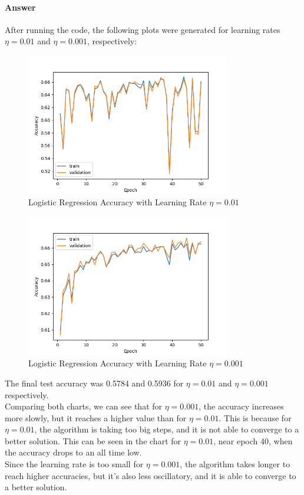 \documentclass{article}
\begin{document}
\paragraph{Answer} After running the code, the following plots were generated for learning rates $\eta = 0.01$ and $\eta = 0.001$, respectively:
\begin{figure}[H]
    \centering
    \includegraphics[width=0.8\textwidth]{"plots/1_1_b_001.png"}
    \caption{Logistic Regression Accuracy with Learning Rate $\eta = 0.01$}
    \label{1.1.b 0.01 Plot}
\end{figure}

\begin{figure}[H]
    \centering
    \includegraphics[width=0.8\textwidth]{"plots/1_1_b_0001.png"}
    \caption{Logistic Regression Accuracy with Learning Rate $\eta= 0.001$}
    \label{1.1.b 0.0001 Plot}
\end{figure}

The final test accuracy was 0.5784 and 0.5936 for $\eta = 0.01$ and $\eta = 0.001$ respectively.\\
Comparing both charts, we can see that for $\eta = 0.001$, the accuracy increases more slowly, but it reaches a higher value than for $\eta = 0.01$. 
This is because for $\eta = 0.01$, the algorithm is taking too big steps, and it is not able to converge to a better solution. This can be 
seen in the chart for $\eta = 0.01$, near epoch 40, when the accuracy drops to an all time low.\\
Since the learning rate is too small for $\eta = 0.001$, the algorithm takes longer to reach higher accuracies, but it's also 
less oscillatory, and it is able to converge to a better solution.\\
\end{document}
